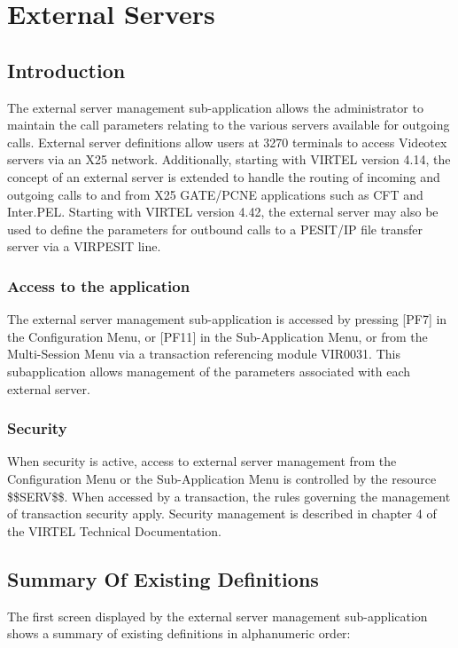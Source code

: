 \documentclass[letterpaper,10pt,english]{sphinxmanual}
\begin{document}
\chapter{External Servers}
\label{\detokenize{connectivity_guide:external-servers}}

\section{Introduction}
\label{\detokenize{connectivity_guide:id19}}
The external server management sub-application allows the administrator to maintain the call parameters relating to the various servers available for outgoing calls. External server definitions allow users at 3270 terminals to access Videotex servers via an X25 network. Additionally, starting with VIRTEL version 4.14, the concept of an external server
is extended to handle the routing of incoming and outgoing calls to and from X25 GATE/PCNE applications such as CFT and Inter.PEL. Starting with VIRTEL version 4.42, the external server may also be used to define the parameters for outbound calls to a PESIT/IP file transfer server via a VIRPESIT line.


\subsection{Access to the application}
\label{\detokenize{connectivity_guide:id20}}
The external server management sub-application is accessed by pressing {[}PF7{]} in the Configuration Menu, or {[}PF11{]} in the Sub-Application Menu, or from the Multi-Session Menu via a transaction referencing module VIR0031. This subapplication allows management of the parameters associated with each external server.


\subsection{Security}
\label{\detokenize{connectivity_guide:id21}}
When security is active, access to external server management from the Configuration Menu or the Sub-Application
Menu is controlled by the resource \$\$SERV\$\$.
When accessed by a transaction, the rules governing the management of transaction security apply.
Security management is described in chapter 4 of the VIRTEL Technical Documentation.


\section{Summary Of Existing Definitions}
\label{\detokenize{connectivity_guide:id22}}
The first screen displayed by the external server management sub-application shows a summary of existing definitions in alphanumeric order:
\end{document}
